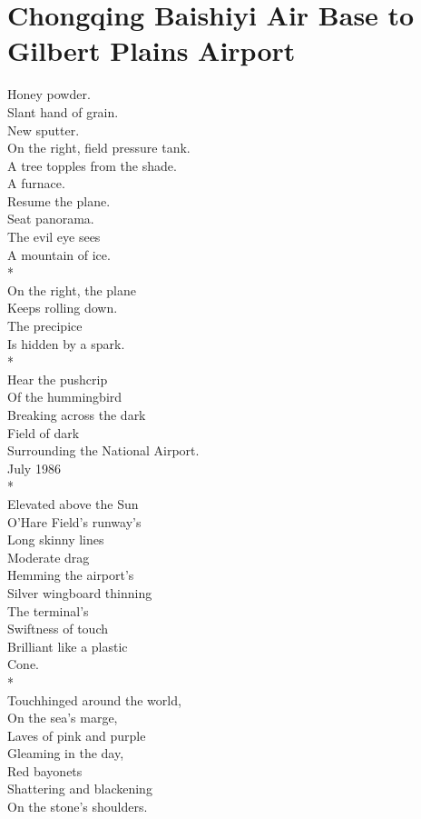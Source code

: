 \documentclass[smalldemyvopaper,11pt,twoside,onecolumn,openright,extrafontsizes]{memoir}
\begin{document}
\chapter{Chongqing Baishiyi Air Base to Gilbert Plains Airport}
Honey powder.
\\Slant hand of grain.
\\New sputter.
\\On the right, field pressure tank.
\\A tree topples from the shade.
\\A furnace.
\\Resume the plane.
\\Seat panorama.
\\The evil eye sees
\\A mountain of ice.
\\*
\\On the right, the plane
\\Keeps rolling down.
\\The precipice
\\Is hidden by a spark.
\\*
\\Hear the pushcrip
\\Of the hummingbird
\\Breaking across the dark
\\Field of dark
\\Surrounding the National Airport.
\\July 1986
\\*
\\Elevated above the Sun
\\O'Hare Field's runway's
\\Long skinny lines
\\Moderate drag
\\Hemming the airport's
\\Silver wingboard thinning
\\The terminal's
\\Swiftness of touch
\\Brilliant like a plastic
\\Cone.
\\*
\\Touchhinged around the world,
\\On the sea's marge,
\\Laves of pink and purple
\\Gleaming in the day,
\\Red bayonets
\\Shattering and blackening
\\On the stone's shoulders.
\end{document}
